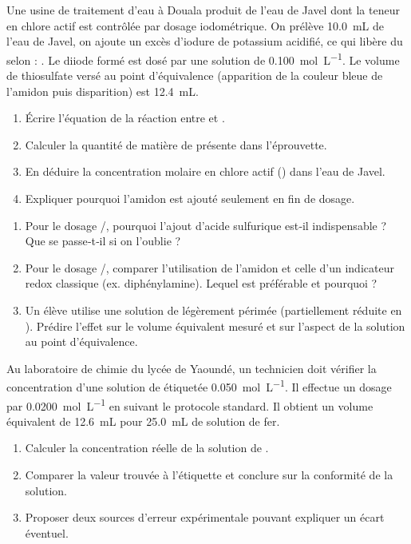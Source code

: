\documentclass[11pt]{article}
\begin{document}
\begin{exercice}
Une usine de traitement d'eau à Douala produit de l'eau de Javel dont la teneur en chlore actif est contrôlée par dosage iodométrique. On prélève \SI{10,0}{mL} de l'eau de Javel, on ajoute un excès d'iodure de potassium acidifié, ce qui libère du  selon : . Le diiode formé est dosé par une solution de  \SI{0,100}{mol.L^{-1}}. Le volume de thiosulfate versé au point d'équivalence (apparition de la couleur bleue de l'amidon puis disparition) est \SI{12,4}{mL}.

\begin{enumerate}
\item Écrire l'équation de la réaction entre  et .
\item Calculer la quantité de matière de  présente dans l'éprouvette.
\item En déduire la concentration molaire en chlore actif () dans l'eau de Javel.
\item Expliquer pourquoi l'amidon est ajouté seulement en fin de dosage.
\end{enumerate}
\end{exercice}

\begin{exercice}
\begin{enumerate}
\item Pour le dosage /, pourquoi l'ajout d'acide sulfurique est‑il indispensable ? Que se passe‑t‑il si on l'oublie ?
\item Pour le dosage /, comparer l'utilisation de l'amidon et celle d'un indicateur redox classique (ex. diphénylamine). Lequel est préférable et pourquoi ?
\item Un élève utilise une solution de  légèrement périmée (partiellement réduite en ). Prédire l'effet sur le volume équivalent mesuré et sur l'aspect de la solution au point d'équivalence.
\end{enumerate}
\end{exercice}

\begin{exercice}
Au laboratoire de chimie du lycée de Yaoundé, un technicien doit vérifier la concentration d'une solution de  étiquetée \SI{0,050}{mol.L^{-1}}. Il effectue un dosage par  \SI{0,0200}{mol.L^{-1}} en suivant le protocole standard. Il obtient un volume équivalent de \SI{12,6}{mL} pour \SI{25,0}{mL} de solution de fer.

\begin{enumerate}
\item Calculer la concentration réelle de la solution de .
\item Comparer la valeur trouvée à l'étiquette et conclure sur la conformité de la solution.
\item Proposer deux sources d'erreur expérimentale pouvant expliquer un écart éventuel.
\end{enumerate}
\end{exercice}
\end{document}
